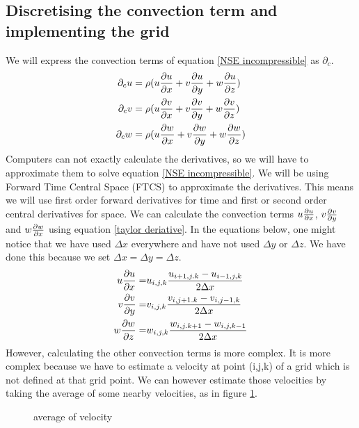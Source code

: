 \documentclass{article}
\begin{document}
\subsection{Discretising the convection term and implementing the grid}
We will express the convection terms of equation \ref{NSE incompressible} as \(\partial _{c}\)\cite{MAC}.
\begin{equation}
\begin{split}
  \partial _cu=\rho(&u\pdv{u}{x}+v\pdv{u}{y}+w\pdv{u}{z})\\
  \partial _cv=\rho(&u\pdv{v}{x}+v\pdv{v}{y}+w\pdv{v}{z})\\
  \partial _cw=\rho(&u\pdv{w}{x}+v\pdv{w}{y}+w\pdv{w}{z})
\end{split}\label{convection terms}
\end{equation}
Computers can not exactly calculate the derivatives, so we will have to approximate them to solve equation \ref{NSE incompressible}. We will be using Forward Time Central Space (FTCS) to approximate the derivatives\cite{MAC}. This means we will use first order forward derivatives for time and first or second order central derivatives for space. We can calculate the convection terms \(u\pdv{u}{x}\), \(v\pdv{v}{y}\) and \(w\pdv{w}{x}\)  using equation \ref{taylor deriative}. In the equations below, one might notice that we have used \(\Delta x\) everywhere and have not used \(\Delta y\) or \(\Delta z\). We have done this because we set \(\Delta x = \Delta y = \Delta z\). 
\[\begin{split}
  u\pdv{u}{x}=& u_{i,j,k}\frac{u_{i+1,j.k}-u_{i-1,j,k}}{2\Delta x}\\
  v\pdv{v}{y}=& v_{i,j,k}\frac{v_{i,j+1.k}-v_{i,j-1,k}}{2\Delta x}\\
  w\pdv{w}{z}=& w_{i,j,k}\frac{w_{i,j.k+1}-w_{i,j,k-1}}{2\Delta x}
\end{split}\]
However, calculating the other convection terms is more complex. It is more complex because we have to estimate a velocity at point (i,j,k) of a grid which is not defined at that grid point. We can however estimate those velocities by taking the average of some nearby velocities, as in figure \ref{velocity to other grid}\cite{MAC}.
\begin{figure}[h]
\centering

\caption{average of velocity} \label{velocity to other grid}
\end{figure}
\end{document}
